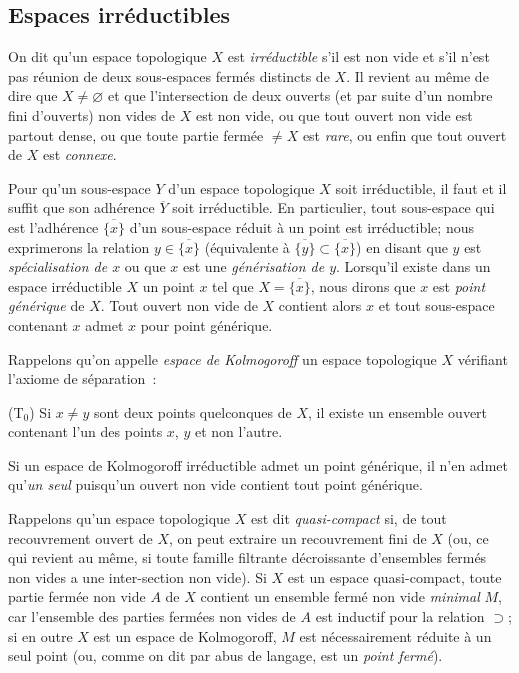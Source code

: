 \subsection{Espaces irréductibles}
\label{subsection:0.2.1-fr}

\begin{env}[2.1.1]
\label{0.2.1.1-fr}
On dit qu'un espace topologique $X$ est \emph{irréductible} s'il est non vide
et s'il n'est pas réunion de deux sous-espaces fermés distincts de $X$. Il
revient au même de dire que $X\neq\varnothing$ et que l'intersection de deux
ouverts (et par suite d'un nombre fini d'ouverts) non vides de $X$ est non
vide, ou que tout ouvert non vide est partout dense, ou que toute partie
fermée $\neq X$ est \emph{rare}, ou enfin que tout ouvert de $X$ est
\emph{connexe}.
\end{env}

\begin{env}[2.1.2]
\label{0.2.1.2-fr}
Pour qu'un sous-espace $Y$ d'un espace topologique $X$ soit irréductible, il
faut et il suffit que son adhérence $\overline Y$ soit irréductible. En
particulier, tout sous-espace qui est l'adhérence $\overline{\{x\}}$ d'un
sous-espace réduit à un point est irréductible; nous exprimerons la relation
$y\in\overline{\{x\}}$ (équivalente à
$\overline{\{y\}}\subset\overline{\{x\}}$) en disant que $y$ est
\emph{spécialisation de $x$} ou que $x$ est une \emph{générisation de $y$}.
Lorsqu'il existe dans un espace irréductible $X$ un point $x$ tel que
$X=\overline{\{x\}}$, nous dirons que $x$ est \emph{point générique} de $X$.
Tout ouvert non vide de $X$ contient alors $x$ et tout sous-espace contenant
$x$ admet $x$ pour point générique.
\end{env}

\begin{env}[2.1.3]
\label{0.2.1.3-fr}
Rappelons qu'on appelle \emph{espace de Kolmogoroff} un espace topologique $X$
vérifiant l'axiome de séparation~:

\smallskip
\noindent
\textup{(T$_0$)} Si $x\neq y$ sont deux points quelconques de $X$, il existe
un ensemble ouvert contenant l'un des points $x$, $y$ et non l'autre.

Si un espace de Kolmogoroff irréductible admet un point générique, il n'en
admet qu'\emph{un seul} puisqu'un ouvert non vide contient tout point
générique.

Rappelons qu'un espace topologique $X$ est dit \emph{quasi-compact} si, de tout
recouvrement ouvert de $X$, on peut extraire un recouvrement fini de $X$ (ou,
ce qui revient au même, si toute famille filtrante décroissante d'ensembles
fermés non vides a une inter-section non vide). Si $X$ est un espace
quasi-compact, toute partie fermée non vide $A$ de $X$ contient un ensemble
fermé non vide \emph{minimal} $M$, car l'ensemble des parties fermées non vides
de $A$ est inductif pour la relation $\supset$; si en outre $X$ est un espace
de Kolmogoroff, $M$ est nécessairement réduite à un seul point (ou, comme on
dit par abus de langage, est un \emph{point fermé}).
\end{env}

